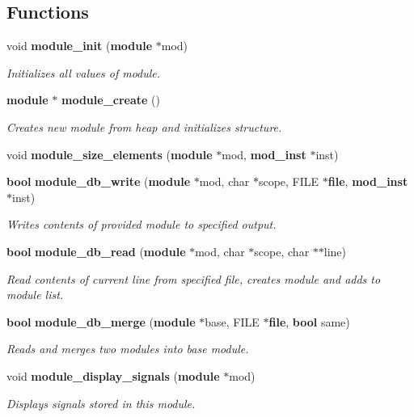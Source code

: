 \subsection*{Functions}
\begin{CompactItemize}
\item 
void {\bf module\_\-init} ({\bf module} $\ast$mod)
\begin{CompactList}\small\item\em Initializes all values of module. \item\end{CompactList}\item 
{\bf module} $\ast$ {\bf module\_\-create} ()
\begin{CompactList}\small\item\em Creates new module from heap and initializes structure. \item\end{CompactList}\item 
void {\bf module\_\-size\_\-elements} ({\bf module} $\ast$mod, {\bf mod\_\-inst} $\ast$inst)
\item 
{\bf bool} {\bf module\_\-db\_\-write} ({\bf module} $\ast$mod, char $\ast$scope, FILE $\ast${\bf file}, {\bf mod\_\-inst} $\ast$inst)
\begin{CompactList}\small\item\em Writes contents of provided module to specified output. \item\end{CompactList}\item 
{\bf bool} {\bf module\_\-db\_\-read} ({\bf module} $\ast$mod, char $\ast$scope, char $\ast$$\ast$line)
\begin{CompactList}\small\item\em Read contents of current line from specified file, creates module and adds to module list. \item\end{CompactList}\item 
{\bf bool} {\bf module\_\-db\_\-merge} ({\bf module} $\ast$base, FILE $\ast${\bf file}, {\bf bool} same)
\begin{CompactList}\small\item\em Reads and merges two modules into base module. \item\end{CompactList}\item 
void {\bf module\_\-display\_\-signals} ({\bf module} $\ast$mod)
\begin{CompactList}\small\item\em Displays signals stored in this module. \item\end{CompactList}\item 
$$
\end{CompactItemize}
